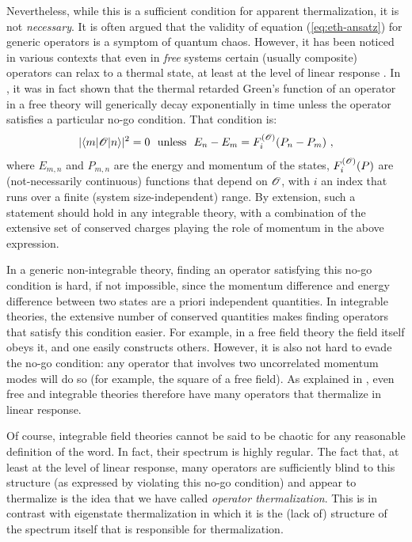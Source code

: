 Nevertheless, while this is a sufficient condition for apparent thermalization, it is not \emph{necessary}. It is often argued that the validity of equation (\ref{eq:eth-ansatz}) for generic operators is a symptom of quantum chaos. However, it has been noticed in various contexts that even in \emph{free} systems certain (usually composite) operators can relax to a thermal state, at least at the level of linear response \cite{Grozdanov:2015nea,Amado:2017kgr, Parker:2018yvk,1905.08266, Banerjee:2019iwd,Craps:2019pma, Sabella-Garnier:2019tsi}.  In \cite{Sabella-Garnier:2019tsi}, it was in fact shown that the thermal retarded Green's function of an operator in a free theory will generically decay exponentially in time unless the operator satisfies a particular no-go condition. That condition is:
\begin{equation}
|\langle m|\mathcal{O}|n\rangle|^2=0 ~~ \text{unless} ~~E_n-E_m=F^{(\mathcal{O})}_{i}(P_n-P_m)~, \label{eq:no-go}
\end{equation}
where $E_{m,n}$ and $P_{m,n}$ are the energy and momentum of the states, $F^{(\mathcal{O})}_{i}(P)$ are (not-necessarily continuous) functions that depend on $\mathcal{O}$, with $i$ an index that runs over a finite (system size-independent) range. By extension, such a statement should hold in any integrable theory, with a combination of the extensive set of conserved charges playing  the role of momentum in the above expression.

In a generic non-integrable theory, finding an operator satisfying this no-go condition is hard, if not impossible, since the momentum difference and energy difference between two states are a priori independent quantities. In integrable theories, the extensive number of conserved quantities makes finding operators that satisfy this condition easier. For example, in a free field theory the field itself obeys it, and one easily constructs others. However, it is also not hard to evade the no-go condition: any operator that involves two uncorrelated momentum modes will do so (for example, the square of a free field). As explained in \cite{Sabella-Garnier:2019tsi}, even free and integrable theories therefore have many operators that thermalize in linear response.

Of course, integrable field theories cannot be said to be chaotic for any reasonable definition of the word. In fact, their spectrum is highly regular. The fact that, at least at the level of linear response, many operators are sufficiently blind to this structure (as expressed by violating this no-go condition) and appear to thermalize is the idea that we have called \emph{operator thermalization}. This is in contrast with eigenstate thermalization in which it is the (lack of) structure of the spectrum itself that is responsible for thermalization.

